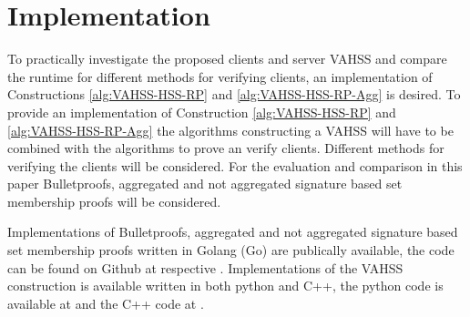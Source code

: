 

\section{Implementation}
\label{sec:implementation}
To practically investigate the proposed clients and server VAHSS and compare the runtime for different methods for verifying clients, an implementation of Constructions \ref{alg:VAHSS-HSS-RP} and \ref{alg:VAHSS-HSS-RP-Agg} is desired. 
To provide an implementation of Construction \ref{alg:VAHSS-HSS-RP} and \ref{alg:VAHSS-HSS-RP-Agg} the algorithms constructing a VAHSS  will have to be combined with the algorithms to prove an verify clients.  Different methods for verifying the clients will be considered. For the evaluation and comparison in this paper Bulletproofs, aggregated and not aggregated signature based set membership proofs will be considered.  %
 

Implementations of Bulletproofs, aggregated and not aggregated signature based set membership proofs  written in Golang (Go) are publically available, the code can be found on Github at \cite{Git:RP} respective \cite{git:Mycode}. Implementations of the VAHSS construction is available written in both python and C++, the python code is available at  \cite{Git:python_vahss} and the C++ code at \cite{Git:C_vahss}. 


